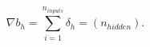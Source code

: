$$ \nabla b_{h} = \sum_{i=1}^{n_{inputs}} \delta_h = (n_{hidden}) .$$






































































